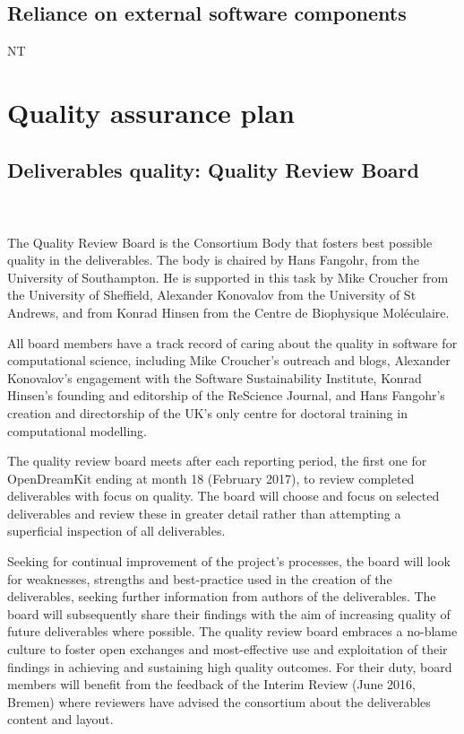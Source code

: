 \documentclass{deliverablereport}
\begin{document}
\subsection{Reliance on external software components}
NT

\section{Quality assurance plan}

\subsection{Deliverables quality: Quality Review Board}
 ~\\~\\

 The Quality Review Board is the Consortium Body that fosters best
 possible quality in the deliverables. The body is chaired by Hans
 Fangohr, from the University of Southampton. He is supported in this
 task by Mike Croucher from the University of Sheffield, Alexander
 Konovalov from the University of St Andrews, and from Konrad Hinsen
 from the Centre de Biophysique Moléculaire.

 All board members have a track record of caring about the quality in
 software for computational science, including Mike Croucher's
 outreach and blogs, Alexander Konovalov's engagement with the Software
 Sustainability Institute, Konrad Hinsen's founding and editorship of
 the ReScience Journal, and Hans Fangohr's creation and directorship
 of the UK's only centre for doctoral training in computational
 modelling.

  The quality review board meets after each reporting period, the first
 one for OpenDreamKit ending at month 18 (February 2017), to review
 completed deliverables with focus on quality. The board will choose
 and focus on selected deliverables and review these in greater detail
 rather than attempting a superficial inspection of all deliverables.

 Seeking for continual improvement of the project's processes, the
 board will look for weaknesses, strengths and best-practice used in
 the creation of the deliverables, seeking further information from
 authors of the deliverables. The board will subsequently share their
 findings with the aim of increasing quality of future deliverables
 where possible. The quality review board embraces a no-blame culture
 to foster open exchanges and most-effective use and exploitation of
 their findings in achieving and sustaining high quality outcomes. For their duty,
 board members will benefit from the feedback of the Interim Review (June 2016, Bremen)
where reviewers have advised the \ODK consortium about the deliverables
 content and layout.
\end{document}
